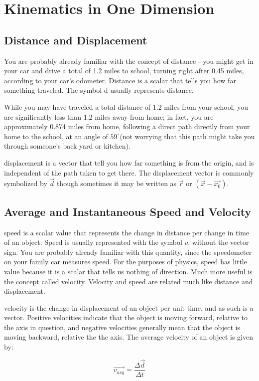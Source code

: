 \chapter{Kinematics in One Dimension}
\section{Distance and Displacement} 

You are probably already familiar with the concept of \gls{distance} - you might get in your car and drive a total of 1.2 miles to school, turning right after 0.45 miles, according to your car's odometer.  Distance is a scalar that tells you how far something traveled.  The symbol d usually represents distance.

While you may have traveled a total distance of 1.2 miles from your school, you are significantly less than 1.2 miles away from home; in fact, you are approximately 0.874 miles from home, following a direct path directly from your home to the school, at an angle of $59^\circ $(not worrying that this path might take you through someone's back yard or kitchen).


  \gls{displacement}  is a vector that tell you how far something is from the origin, and is independent of the path taken to get there.  The displacement vector is commonly symbolized by $\vec{d}$ though sometimes it may be written as $\vec{r}$ or $(\vec{x}-\vec{x_0})$. 

\section{Average and Instantaneous Speed and Velocity}

\gls{speed}  is a scalar value that represents the change in distance per change in time of an object.  Speed is usually represented with the symbol $v$, without the vector sign.  You are probably already familiar with this quantity, since the speedometer on your family car measures speed.  For the purposes of physics, speed has little value because it is a scalar that tells us nothing of direction.  Much more useful is the concept called velocity.  Velocity and speed are related much like distance and displacement.  

\gls{velocity}  is the change in displacement of an object per unit time, and as such is a vector.  Positive velocities indicate that the object is moving forward, relative to the axis in question, and negative velocities generally mean that the object is moving backward, relative the the axis.  The average velocity of an object is given by:
\begin{mdframed}[backgroundcolor=orange!20!white]
	\begin{equation}
	\overrightarrow{v_{avg}} = \frac{\Delta\vec{d}}{\Delta t} 
		\label{eqn:velocity}
	\end{equation}
\end{mdframed}

